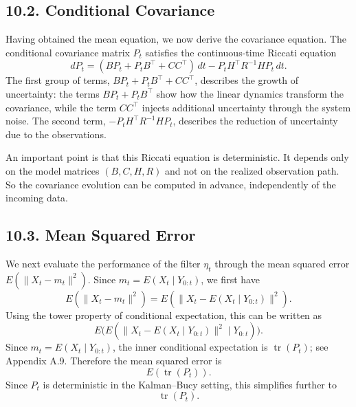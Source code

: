 \documentclass[11pt]{article}
\theoremstyle{definition}
\theoremstyle{remark}
\begin{document}
\subsection*{10.2. Conditional Covariance}
Having obtained the mean equation, we now derive the covariance equation. The conditional covariance matrix $P_t$ satisfies the continuous-time Riccati equation
\[
dP_t=(BP_t+P_tB^\top+CC^\top)\,dt-P_tH^\top R^{-1}HP_t\,dt.
\]
The first group of terms, $BP_t+P_tB^\top+CC^\top$, describes the growth of uncertainty: the terms $BP_t+P_tB^\top$ show how the linear dynamics transform the covariance, while the term $CC^\top$ injects additional uncertainty through the system noise. The second term, $-P_tH^\top R^{-1}HP_t$, describes the reduction of uncertainty due to the observations.

An important point is that this Riccati equation is deterministic. It depends only on the model matrices $(B,C,H,R)$ and not on the realized observation path. So the covariance evolution can be computed in advance, independently of the incoming data.

\subsection*{10.3. Mean Squared Error}
We next evaluate the performance of the filter $\eta_t$ through the mean squared error $E(\|X_t-m_t\|^2)$.
Since $m_t=E(X_t\mid Y_{0:t})$, we first have
\[
E(\|X_t-m_t\|^2)=E(\|X_t-E(X_t\mid Y_{0:t})\|^2).
\]
Using the tower property of conditional expectation, this can be written as
\[
E\bigl(E(\|X_t-E(X_t\mid Y_{0:t})\|^2\mid Y_{0:t})\bigr).
\]
Since $m_t=E(X_t\mid Y_{0:t})$, the inner conditional expectation is $\operatorname{tr}(P_t)$; see Appendix A.9.
Therefore the mean squared error is
\[
E(\operatorname{tr}(P_t)).
\]
Since $P_t$ is deterministic in the Kalman--Bucy setting, this simplifies further to
\[
\operatorname{tr}(P_t).
\]
\end{document}
